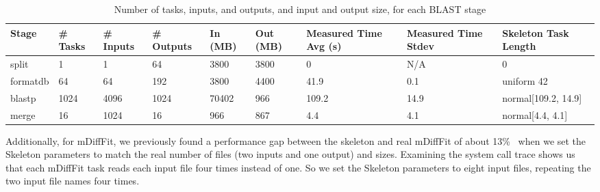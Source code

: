 \documentclass[preprint,12pt]{elsarticle}
\newcommand{\katznote}[1]{ {\textcolor{blue}    { ***Dan:   #1 }}}
\newcommand{\zhaonote}[1]{{\textcolor{darkgreen}{ ***Zhao:  #1 }}}
\newcommand{\katznote}[1]{}
\newcommand{\zhaonote}[1]{}
\begin{document}
\begin{table}[t]
\begin{center}
    \caption{Number of tasks, inputs, and outputs, and input and output size, for each BLAST stage}
    \begin{scriptsize}
    \begin{tabular}{ | p{1.25cm} | p{0.6cm} | p{0.65cm} | p{0.75cm} | p{0.85cm} | p{0.85cm} | p{1.2cm} | p{1.2cm} | p{2.5cm} |}
    \hline
    Stage & \# Tasks & \# Inputs & \# Outputs & In (MB) & Out (MB) & Measured Time Avg (s) & Measured Time Stdev & Skeleton Task Length\\ \hline \hline
    split & 1 & 1 & 64 & 3800 & 3800 & 0 & N/A & 0\\ \hline
	formatdb & 64 & 64 & 192 & 3800 & 4400 & 41.9 & 0.1 & uniform 42\\ \hline
	blastp & 1024 & 4096 & 1024 & 70402 & 966 & 109.2 & 14.9 & normal[109.2, 14.9]\\ \hline
	merge & 16 & 1024 & 16 & 966 & 867 & 4.4 & 4.1 & normal[4.4, 4.1]\\ \hline
    \end{tabular}
    \end{scriptsize}
    \label{tb:blast-stats}
\end{center}   
\end{table}



%
Additionally, for mDiffFit, we previously found a performance
gap between the skeleton and real mDiffFit of about 13\%~\cite{Skeleton2013} when we set the Skeleton parameters to match the
real number of files (two inputs and one output) and sizes. Examining the system call 
trace shows us that each mDiffFit task reads each input file four times instead of one. So we set 
the Skeleton parameters to eight input files, repeating the two input file names four times.
\end{document}
